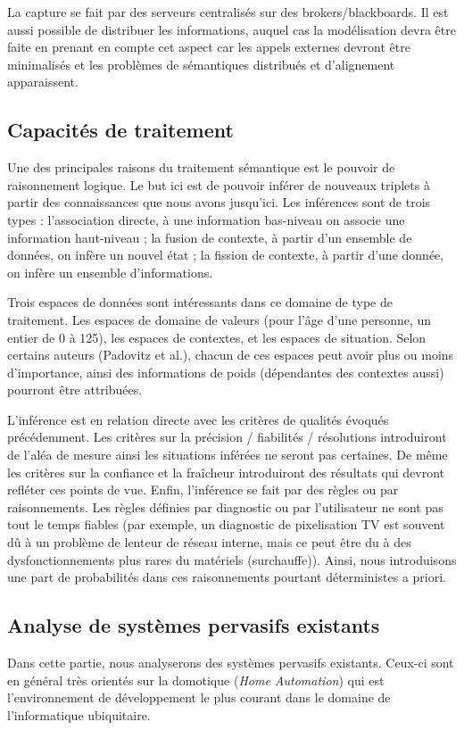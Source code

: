 La capture se fait par des serveurs centralisés sur des brokers/blackboards. Il est aussi possible de distribuer les informations, auquel cas la modélisation devra être faite en prenant en compte cet aspect car les appels externes devront être minimalisés et les problèmes de sémantiques distribués et d'alignement apparaissent.

\subsection{Capacités de traitement}
Une des principales raisons du traitement sémantique est le pouvoir de raisonnement logique. Le but ici est de pouvoir inférer de nouveaux triplets à partir des connaissances que nous avons jusqu'ici. Les inférences sont de trois types : l'association directe, à une information bas-niveau on associe une information haut-niveau ; la fusion de contexte, à partir d'un ensemble de données, on infère un nouvel état ; la fission de contexte, à partir d'une donnée, on infère un ensemble d'informations.

Trois espaces de données sont intéressants dans ce domaine de type de traitement. Les espaces de domaine de valeurs (pour l'âge d'une personne, un entier de 0 à 125), les espaces de contextes, et les espaces de situation. Selon certains auteurs (Padovitz et al.), chacun de ces espaces peut avoir plus ou moins d'importance, ainsi des informations de poids (dépendantes des contextes aussi) pourront être attribuées.

L'inférence est en relation directe avec les critères de qualités évoqués précédemment. Les critères sur la précision / fiabilités / résolutions introduiront de l'aléa de mesure ainsi les situations inférées ne seront pas certaines. De même les critères sur la confiance et la fraîcheur introduiront des résultats qui devront refléter ces points de vue. Enfin, l'inférence se fait par des règles ou par raisonnements. Les règles définies par diagnostic ou par l'utilisateur ne sont pas tout le temps fiables (par exemple, un diagnostic de pixelisation TV est souvent dû à un problème de lenteur de réseau interne, mais ce peut être du à des dysfonctionnements plus rares du matériels (surchauffe)). Ainsi, nous introduisons une part de probabilités dans ces raisonnements pourtant déterministes a priori.

\subsection{Analyse de systèmes pervasifs existants}
Dans cette partie, nous analyserons des systèmes pervasifs existants. Ceux-ci sont en général très orientés sur la domotique (\textit{Home Automation}) qui est l'environnement de développement le plus courant dans le domaine de l'informatique ubiquitaire.

